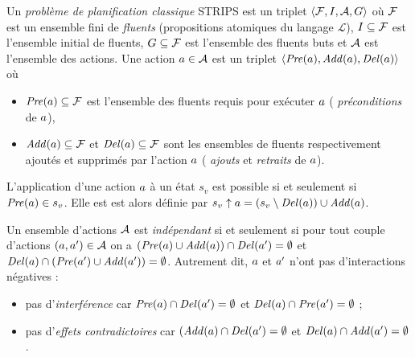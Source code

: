 \begin{definition}
Un \emph{problème de planification classique} STRIPS est un triplet $\langle \mathcal{F}, I, \mathcal{A} , G \rangle$ où $\mathcal{F}$ est un ensemble fini de \emph{fluents} (propositions atomiques du langage $\mathcal{L}$), $I \subseteq \mathcal{F}$ est l'ensemble initial de fluents, $G \subseteq \mathcal{F}$ est l'ensemble des fluents buts et $\mathcal{A}$ est l'ensemble des actions.
Une action $a \in \mathcal{A}$ est un triplet $\langle \mathit{Pre}(a), \mathit{Add}(a), \mathit{Del}(a) \rangle$ où

\begin{itemize}
\item $\mathit{Pre}(a) \subseteq \mathcal{F}$ est l'ensemble des fluents requis pour exécuter $a$ (%
\emph{préconditions} de $a$),
\item $\mathit{Add}(a) \subseteq \mathcal{F}$ et $\mathit{Del}(a) \subseteq \mathcal{F}$ sont les ensembles de fluents respectivement ajoutés et supprimés par l'action $a$ (%
\emph{ajouts} et %
\emph{retraits} de $a$).
\end{itemize}
\end{definition}

\begin{definition}
L'application d'une action $a$ à un état $s_{v}$ est possible si et seulement si $\mathit{Pre}(a)\in s_{v}$. Elle est est alors définie par $s_{v}\uparrow a=(s_{v} \setminus \mathit{Del}(a)) \cup \mathit{Add}(a)$.
\end{definition}

\begin{definition}
Un ensemble d'actions $\mathcal{A}$ est \emph{indépendant} si et seulement si pour tout couple d'actions $(a,a')\in\mathcal{A}$ on a $(\mathit{Pre}(a)\cup\mathit{Add}(a))\cap\mathit{Del}(a')=\emptyset$ et $\mathit{Del}(a)\cap(\mathit{Pre}(a')\cup\mathit{Add}(a'))=\emptyset$.
Autrement dit, $a$ et $a'$ n'ont pas d'interactions négatives :
\begin{itemize}
    \item pas d'\emph{interférence} car $\mathit{Pre}(a)\cap\mathit{Del}(a')=\emptyset$ et $\mathit{Del}(a)\cap\mathit{Pre}(a')=\emptyset$ ; 
    \item pas d'\emph{effets contradictoires} car $(\mathit{Add}(a)\cap\mathit{Del}(a')=\emptyset$ et $\mathit{Del}(a)\cap\mathit{Add}(a')=\emptyset$.
\end{itemize}
\end{definition}





